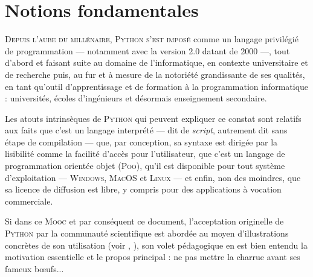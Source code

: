 \chapter[Notions fondamentales en \textsc{Python}]{Notions fondamentales}
\label{chap:X}



\lettrine[findent=-0.7pt]{D}{epuis l'aube du millénaire, \textsc{Python} s'est imposé} comme un langage privilégié de programmation --- notamment avec la version 2.0 datant de 2000 ---, tout d'abord et faisant suite au domaine de l'informatique, en contexte universitaire et de recherche puis, au fur et à mesure de la notoriété grandissante de ses qualités, en tant qu'outil d'apprentissage et de formation à la programmation informatique : universités, écoles d'ingénieurs et désormais enseignement secondaire.
\parnotes

Les atouts intrinsèques de \textsc{Python} qui peuvent expliquer ce constat sont relatifs aux faits que c'est un langage interprété --- dit de \textit{script}, autrement dit sans étape de compilation --- que, par conception, sa syntaxe est dirigée par la lisibilité comme la facilité d'accès pour l'utilisateur, que c'est un langage de programmation orientée objet (\textsc{Poo}), qu'il est disponible pour tout système d'exploitation --- \textsc{Windows}, \textsc{MacOS} et \textsc{Linux} --- et enfin, non des moindres, que sa licence de diffusion est libre, y compris pour des applications à vocation commerciale.

Si dans ce \textsc{Mooc} et par conséquent ce document, l'acceptation originelle de \textsc{Python} par la communauté scientifique est abordée au moyen d'illustrations concrètes de son utilisation (voir , ), son volet pédagogique en est bien entendu la motivation essentielle et le propos principal : ne pas mettre la charrue avant ses fameux bœufs... 

